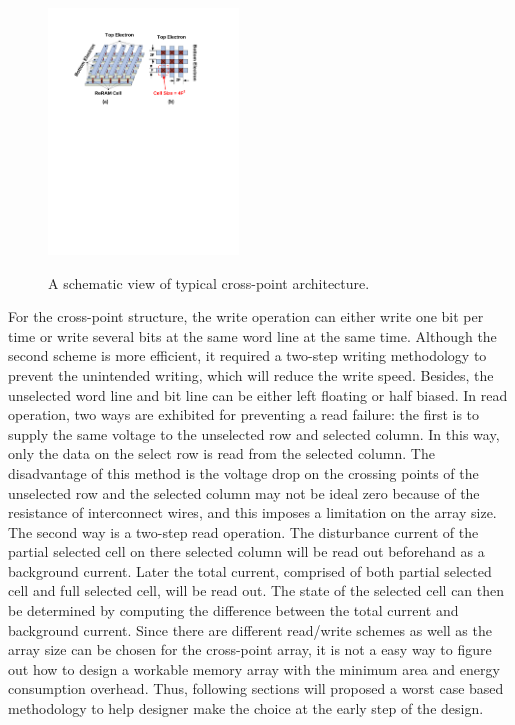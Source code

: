\begin{figure}
\centering
  \includegraphics[width=0.45\textwidth]{./figures/crossbar_array2.pdf}\\
  \caption{A schematic view of typical cross-point architecture.}\label{fig:array}
\vspace{-10pt}
\end{figure}

For the cross-point structure, the write operation can either write one bit per time or write several bits at the same word line at the same time. Although the second scheme is more efficient, it required a two-step writing methodology to prevent the unintended writing, which will reduce the write speed. Besides, the unselected word line and bit line can be either left floating or half biased. In read operation, two ways are exhibited for preventing a read failure: the first is to supply the same voltage to the unselected row and selected column. In this way, only the data on the select row is read from the selected column. The disadvantage of this method is the voltage drop on the crossing points of the unselected row and the selected column may not be ideal zero because of the resistance of interconnect wires, and this imposes a limitation on the array size. The second way is a two-step read operation. The disturbance current of the partial selected cell on there selected column will be read out beforehand as a background current. Later the total current, comprised of both partial selected cell and full selected cell, will be read out. The state of the selected cell can then be determined by computing the difference between the total current and background current. Since there are different read/write schemes as well as the array size can be chosen for the cross-point array, it is not a easy way to figure out how to design a workable memory array with the minimum area and energy consumption overhead. Thus, following sections will proposed a worst case based methodology to help designer make the choice at the early step of the design.


